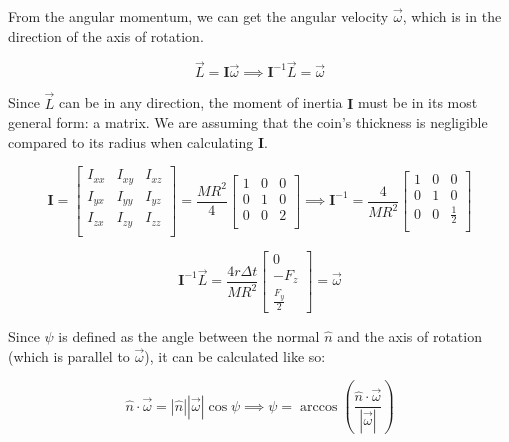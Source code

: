 \documentclass[english,12pt,a4paper,final]{article}
\begin{document}
From the angular momentum, we can get the angular velocity $\vec{\omega}$, which is in the direction of the axis of rotation.

\begin{equation*}
	\vec{L} = \mathbf{I} \vec{\omega} \implies \mathbf{I}^{-1} \vec{L} = \vec{\omega}
\end{equation*}

Since $\vec{L}$ can be in any direction, the moment of inertia $\mathbf{I}$ must be in its most general form: a matrix. We are assuming that the coin's thickness is negligible compared to its radius when calculating $\mathbf{I}$.

\begin{equation*}
	\mathbf{I}
	=
	\begin{bmatrix}
		I_{xx} & I_{xy} & I_{xz} \\
		I_{yx} & I_{yy} & I_{yz} \\
		I_{zx} & I_{zy} & I_{zz} \\
	\end{bmatrix}
	=
	\frac{MR^2}{4}
	\begin{bmatrix}
		1 & 0 & 0 \\
		0 & 1 & 0 \\
		0 & 0 & 2 \\
	\end{bmatrix}
	\implies
	\mathbf{I}^{-1}
	=
	\frac{4}{MR^2}
	\begin{bmatrix}
		1 & 0 & 0 \\
		0 & 1 & 0 \\
		0 & 0 & \frac{1}{2} \\
	\end{bmatrix}
\end{equation*}

\begin{equation*}
	\mathbf{I}^{-1} \vec{L} = \frac{4r\Delta t}{MR^2} \begin{bmatrix}0\\- F_z \\ \frac{F_y}{2} \end{bmatrix} = \vec{\omega}
\end{equation*}

Since $\psi$ is defined as the angle between the normal $\hat{n}$ and the axis of rotation (which is parallel to $\vec{\omega}$), it can be calculated like so:

\begin{equation*}
	\hat{n} \cdot \vec{\omega} = |\hat{n}| |\vec{\omega}| \cos\psi \implies \psi = \arccos\left(\frac{\hat{n}\cdot\vec{\omega}}{|\vec{\omega}|}\right)
\end{equation*}
\end{document}

